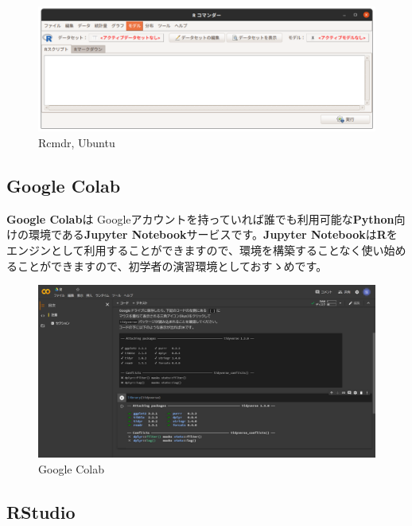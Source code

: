 \documentclass[
  12pt,
]{book}
\begin{document}
\begin{figure}[H]

{\centering \includegraphics[width=0.85\linewidth,]{./fig/RCmdr} 

}

\caption{Rcmdr, Ubuntu}\label{fig:unnamed-chunk-15}
\end{figure}

\hypertarget{google-colab}{%
\subsection{Google Colab}\label{google-colab}}

\textbf{Google Colab}は Googleアカウントを持っていれば誰でも利用可能な\textbf{Python}向けの環境である\textbf{Jupyter Notebook}サービスです。\textbf{Jupyter Notebook}は\textbf{R}をエンジンとして利用することができますので、環境を構築することなく使い始めることができますので、初学者の演習環境としておすゝめです。

\begin{figure}[H]

{\centering \includegraphics[width=0.85\linewidth,]{./fig/Colab/Firsttime} 

}

\caption{Google Colab}\label{fig:unnamed-chunk-16}
\end{figure}

\hypertarget{rstudio}{%
\subsection{RStudio}\label{rstudio}}
\end{document}
